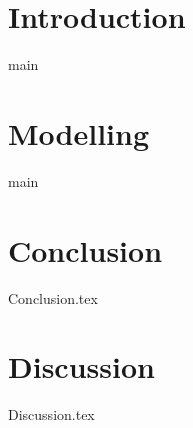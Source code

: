\documentclass[oneside]{report}
\begin{document}
	\tableofcontents
	\listoffigures
	\clearpage
{}
	\begin{abstract}
		{abstract}
	\end{abstract}

	\chapter{Introduction}
		{main}
	\chapter{Modelling}
		{main}
	\chapter{Conclusion}
		{Conclusion.tex}
	\chapter{Discussion}
		{Discussion.tex}

	
\end{document}
